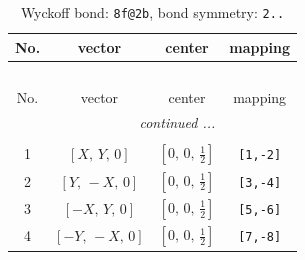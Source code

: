 \documentclass[fleqn,8pt]{jsarticle}
\begin{document}
\renewcommand{\arraystretch}{1.2}
\begin{longtable}{cccc}
\caption{Wyckoff bond: {\tt 8f@2b}, bond symmetry: {\tt 2..}}
 \\
 \hline \hline
No. & vector & center & mapping \\ \hline \endfirsthead

\multicolumn{3}{l}{\tablename\ \thetable{}} \\
 \hline \hline
No. & vector & center & mapping \\ \hline \endhead

 \hline \hline
\multicolumn{3}{r}{\footnotesize\it continued ...} \\ \endfoot

 \hline \hline
\multicolumn{3}{r}{} \\ \endlastfoot

1 & $\left[ X,\, Y,\, 0 \right]$ & $\left[ 0,\, 0,\, \frac{1}{2} \right]$ & {\tt [1,-2]} \\ \hline
2 & $\left[ Y,\, - X,\, 0 \right]$ & $\left[ 0,\, 0,\, \frac{1}{2} \right]$ & {\tt [3,-4]} \\ \hline
3 & $\left[ - X,\, Y,\, 0 \right]$ & $\left[ 0,\, 0,\, \frac{1}{2} \right]$ & {\tt [5,-6]} \\ \hline
4 & $\left[ - Y,\, - X,\, 0 \right]$ & $\left[ 0,\, 0,\, \frac{1}{2} \right]$ & {\tt [7,-8]} \\
\end{longtable}
\renewcommand{\arraystretch}{1.2}
\end{document}
